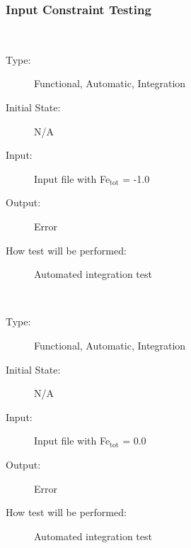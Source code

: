 \documentclass[12pt, titlepage]{article}
\newcounter{testnum} %
\begin{document}
\subsubsection{Input Constraint Testing}

\begin{addmargin}[2em]{0em}
\\
\begin{addmargin}[2em]{0em}
\begin{description}
\item[Type:] Functional, Automatic, Integration
					
\item[Initial State:] N/A
					
\item[Input:] Input file with Fe$_{\text{tot}}$ = -1.0\\
					
\item[Output:] Error
					
\item[How test will be performed:] Automated integration test\\
\end{description}
\end{addmargin}

\\
\begin{addmargin}[2em]{0em}
\begin{description}
\item[Type:] Functional, Automatic, Integration
					
\item[Initial State:] N/A
					
\item[Input:] Input file with Fe$_{\text{tot}}$ = 0.0\\
					
\item[Output:] Error
					
\item[How test will be performed:] Automated integration test\\
\end{description}
\end{addmargin}


\end{addmargin}
\end{document}

